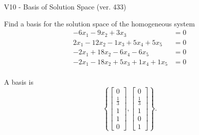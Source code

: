 \begin{exercise}
  \begin{exerciseTitle}V10 - Basis of Solution Space (ver. 433)\end{exerciseTitle}
  \begin{exerciseStatement}
    Find a basis for the solution space of the homogeneous system 
\begin{align*}
 -6 x_ 1 -9 x_ 2 + 3 x_ 3 &= 0  \\ 
  2 x_ 1 -12 x_ 2 -1 x_ 3 + 5 x_ 4 + 5 x_ 5 &= 0  \\ 
  -2 x_ 1 + 18 x_ 2 -6 x_ 4 -6 x_ 5 &= 0  \\ 
  -2 x_ 1 -18 x_ 2 + 5 x_ 3 + 1 x_ 4 + 1 x_ 5 &= 0  \\ 
 \end{align*}


 
  \end{exerciseStatement}

  \begin{exerciseAnswer}
   A basis is   
\[\left\{\left[\begin{array}{c}
0 \\
\frac{1}{3} \\
1 \\
1 \\
0
\end{array}\right] , \left[\begin{array}{c}
0 \\
\frac{1}{3} \\
1 \\
0 \\
1
\end{array}\right]\right\}.\]

  


  \end{exerciseAnswer}
\end{exercise}